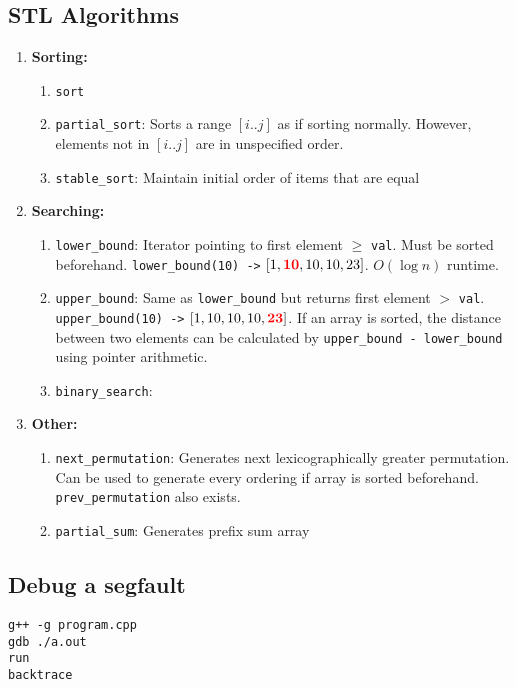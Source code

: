 \documentclass[../hackpack.tex]{subfiles}
\begin{document}
\subsection{STL Algorithms}
\begin{enumerate}[-]
  \item \textbf{Sorting:}
  \begin{enumerate}[-]
    \item \lstinline{sort}
    \item \lstinline{partial_sort}: Sorts a range $[i..j]$ as if sorting normally. However, elements not in $[i..j]$ are in unspecified order.
    \item \lstinline{stable_sort}: Maintain initial order of items that are equal
  \end{enumerate} 
  \item \textbf{Searching:}
  \begin{enumerate}[-]
    \item \lstinline{lower_bound}: Iterator pointing to first element $\geq$ \lstinline{val}. Must be sorted beforehand. \lstinline[]{lower_bound(10) ->} $[1, \textcolor{red}{\mathbf{10}}, 10, 10, 23]$. $O(\log{n})$ runtime.
    \item \lstinline{upper_bound}: Same as \lstinline{lower_bound} but returns first element $>$ \lstinline{val}. \lstinline[]{upper_bound(10) ->} $[1, 10, 10, 10, \textcolor{red}{\mathbf{23}}]$. If an array is sorted, the distance between two elements can be calculated by \lstinline{upper_bound - lower_bound} using pointer arithmetic.
    \item \lstinline{binary_search}: 
  \end{enumerate}
  \item \textbf{Other:}
  \begin{enumerate}[-]
    \item \lstinline{next_permutation}: Generates next lexicographically greater permutation. Can be used to generate every ordering if array is sorted beforehand. \lstinline{prev_permutation} also exists.
    \item \lstinline{partial_sum}: Generates prefix sum array
  \end{enumerate} 
\end{enumerate}

\subsection{Debug a segfault}
\begin{lstlisting}
g++ -g program.cpp
gdb ./a.out
run
backtrace  
\end{lstlisting}
\end{document}
